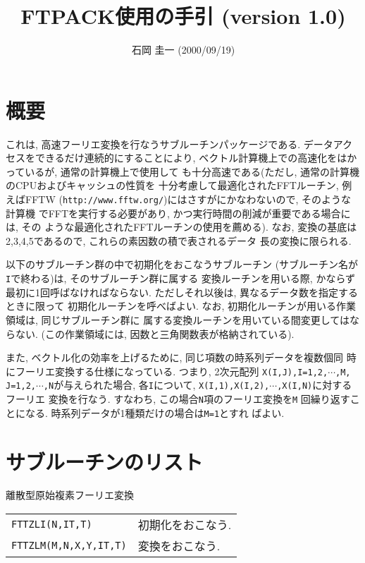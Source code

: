 \documentclass[a4j]{jarticle}
\title{FTPACK使用の手引 (version 1.0)}
\author{石岡 圭一  (2000/09/19)}
\date{}
\begin{document}
\maketitle

\section{概要}

これは, 高速フーリエ変換を行なうサブルーチンパッケージである.
データアクセスをできるだけ連続的にすることにより,
ベクトル計算機上での高速化をはかっているが, 通常の計算機上で使用して
も十分高速である(ただし, 通常の計算機のCPUおよびキャッシュの性質を
十分考慮して最適化されたFFTルーチン, 例えばFFTW
({\tt http://www.fftw.org/})にはさすがにかなわないので, そのような計算機
でFFTを実行する必要があり, かつ実行時間の削減が重要である場合には, その
ような最適化されたFFTルーチンの使用を薦める).
なお, 変換の基底は2,3,4,5であるので, これらの素因数の積で表されるデータ
長の変換に限られる.

\vspace{1em}
以下のサブルーチン群の中で初期化をおこなうサブルーチン
(サブルーチン名が{\tt I}で終わる)は, そのサブルーチン群に属する
変換ルーチンを用いる際, かならず最初に1回呼ばなければならない. 
ただしそれ以後は, 異なるデータ数を指定するときに限って
初期化ルーチンを呼べばよい. 
なお, 初期化ルーチンが用いる作業領域は, 同じサブルーチン群に
属する変換ルーチンを用いている間変更してはならない. 
(この作業領域には, 因数と三角関数表が格納されている). 

\vspace{1em}
また, ベクトル化の効率を上げるために, 同じ項数の時系列データを複数個同
時にフーリエ変換する仕様になっている. つまり, 2次元配列
{\tt X(I,J),I=1,2,$\cdots$,M, J=1,2,$\cdots$,N}が与えられた場合, 
各{\tt I}について, {\tt X(I,1),X(I,2),$\cdots$,X(I,N)}に対するフーリエ
変換を行なう. すなわち, この場合{\tt N}項のフーリエ変換を{\tt M}
回繰り返すことになる. 時系列データが1種類だけの場合は{\tt M=1}とすれ
ばよい.

\newpage  
\section{サブルーチンのリスト}

  離散型原始複素フーリエ変換

  \vspace{1em}
  \begin{tabular}{p{7cm}p{10cm}}
    {\tt FTTZLI(N,IT,T)} & 初期化をおこなう.\\
    {\tt FTTZLM(M,N,X,Y,IT,T)} & 変換をおこなう.
  \end{tabular}
\end{document}
